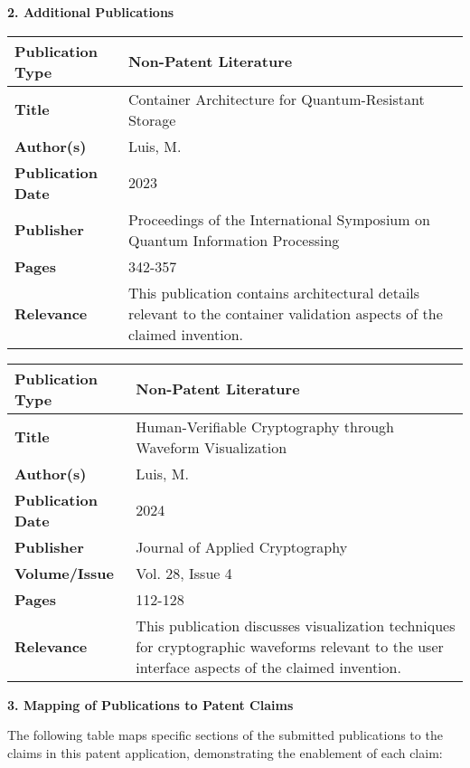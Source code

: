 \documentclass[12pt,letterpaper]{article}
\newcommand{\papertitle}[1]{\noindent\begin{center}\textbf{#1}\end{center}}
\begin{document}
\newpage
\papertitle{2. Additional Publications}

\begin{longtable}{|p{1.5in}|p{4.5in}|}
\hline
\textbf{Publication Type} & Non-Patent Literature \\
\hline
\textbf{Title} & Container Architecture for Quantum-Resistant Storage \\
\hline
\textbf{Author(s)} & Luis, M. \\
\hline
\textbf{Publication Date} & 2023 \\
\hline
\textbf{Publisher} & Proceedings of the International Symposium on Quantum Information Processing \\
\hline
\textbf{Pages} & 342-357 \\
\hline
\textbf{Relevance} & This publication contains architectural details relevant to the container validation aspects of the claimed invention. \\
\hline
\end{longtable}

\begin{longtable}{|p{1.5in}|p{4.5in}|}
\hline
\textbf{Publication Type} & Non-Patent Literature \\
\hline
\textbf{Title} & Human-Verifiable Cryptography through Waveform Visualization \\
\hline
\textbf{Author(s)} & Luis, M. \\
\hline
\textbf{Publication Date} & 2024 \\
\hline
\textbf{Publisher} & Journal of Applied Cryptography \\
\hline
\textbf{Volume/Issue} & Vol. 28, Issue 4 \\
\hline
\textbf{Pages} & 112-128 \\
\hline
\textbf{Relevance} & This publication discusses visualization techniques for cryptographic waveforms relevant to the user interface aspects of the claimed invention. \\
\hline
\end{longtable}

\newpage
\papertitle{3. Mapping of Publications to Patent Claims}

\noindent The following table maps specific sections of the submitted publications to the claims in this patent application, demonstrating the enablement of each claim:
\end{document}
